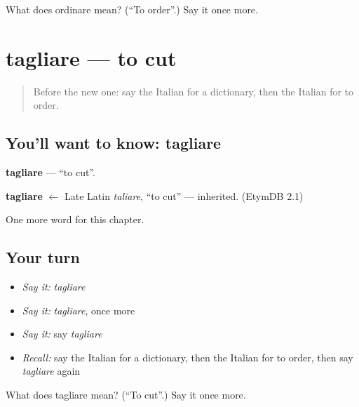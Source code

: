 \begin{tcolorbox}[breakable,colback=teal!4,colframe=teal!35!black,title={Before you move on}]
What does ordinare mean? (\textquotedblleft{}To order\textquotedblright{}.) Say it once more.
\end{tcolorbox}
\section[tagliare]{tagliare — to cut}

\label{lesson:IT-C233-tagliare}



\begin{quote}
Before the new one: say the Italian for a dictionary, then the Italian for to order.
\end{quote}

\subsection*{You'll want to know: tagliare}
\textbf{tagliare} — \textquotedblleft{}to cut\textquotedblright{}.

\begin{cousinweb}
\textbf{tagliare} $\leftarrow$ Late Latin \emph{taliare}, \textquotedblleft{}to cut\textquotedblright{} — inherited. (EtymDB 2.1)
\end{cousinweb}

\begin{grammarlens}[title={What you've built}]
One more word for this chapter.
\end{grammarlens}

\subsection*{Your turn}
\begin{itemize}
\raggedright
  \item \emph{Say it:} \emph{tagliare}
  \item \emph{Say it:} \emph{tagliare}, once more
  \item \emph{Say it:} say \emph{tagliare}
  \item \emph{Recall:} say the Italian for a dictionary, then the Italian for to order, then say \emph{tagliare} again
\end{itemize}

\begin{tcolorbox}[breakable,colback=teal!4,colframe=teal!35!black,title={Before you move on}]
What does tagliare mean? (\textquotedblleft{}To cut\textquotedblright{}.) Say it once more.
\end{tcolorbox}
